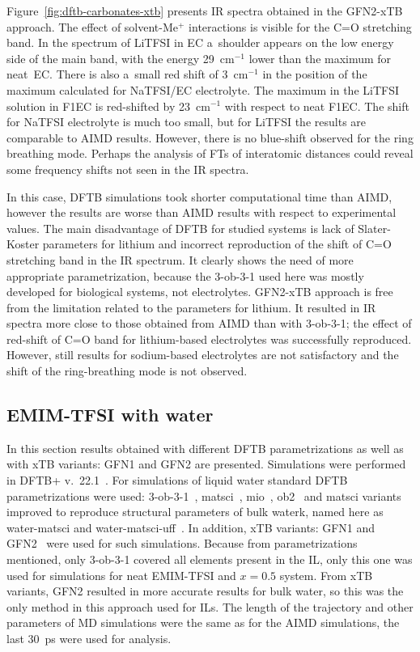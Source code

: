 Figure~\ref{fig:dftb-carbonates-xtb} presents IR spectra obtained in the GFN2-xTB approach. The effect of solvent-Me$^{+}$ interactions is visible for the C=O stretching band. In the spectrum of LiTFSI in EC a~shoulder appears on the low energy side of the main band, with the energy 29~cm$^{-1}$ lower than the maximum for neat~EC. There is also a~small red shift of 3~cm$^{-1}$ in the position of the maximum calculated for NaTFSI/EC electrolyte. The maximum in the LiTFSI solution in F1EC is red-shifted by 23~cm$^{-1}$ with respect to neat F1EC. The shift for NaTFSI electrolyte is much too small, but for LiTFSI the results are comparable to AIMD results. However, there is no blue-shift observed for the ring breathing mode. Perhaps the analysis of FTs of interatomic distances could reveal some frequency shifts not seen in the IR spectra.

In this case, DFTB simulations took shorter computational time than AIMD, however the results are worse than AIMD results with respect to experimental values. The main disadvantage of DFTB for studied systems is lack of Slater-Koster parameters for lithium and incorrect reproduction of the shift of C=O stretching band in the IR spectrum. It clearly shows the need of more appropriate parametrization, because the 3-ob-3-1 used here was mostly developed for biological systems, not electrolytes. GFN2-xTB approach is free from the limitation related to the parameters for lithium. It resulted in IR spectra more close to those obtained from AIMD than with 3-ob-3-1; the effect of red-shift of C=O band for lithium-based electrolytes was successfully reproduced. However, still results for sodium-based electrolytes are not satisfactory and the shift of the ring-breathing mode is not observed.

\cleardoublepage

\subsection{EMIM-TFSI with water}

In this section results obtained with different DFTB parametrizations as well as with xTB variants: GFN1 and GFN2 are presented. Simulations were performed in DFTB+ v.~22.1~\cite{dftb-plus}. For simulations of liquid water standard DFTB parametrizations were used: 3-ob-3-1~\cite{3ob-1,3ob-2,3ob-3,3ob-4}, matsci~\cite{matsci}, mio~\cite{mio}, ob2~\cite{ob2} and matsci variants improved to reproduce structural parameters of bulk waterk, named here as water-matsci and water-matsci-uff~\cite{water-matsci}. In addition, xTB variants: GFN1 and GFN2~\cite{xtb,gfn-2} were used for such simulations. Because from parametrizations mentioned, only 3-ob-3-1 covered all elements present in the IL, only this one was used for simulations for neat EMIM-TFSI and $x = 0.5$ system. From xTB variants, GFN2 resulted in more accurate results for bulk water, so this was the only method in this approach used for ILs. The length of the trajectory and other parameters of MD simulations were the same as for the AIMD simulations, the last 30~ps were used for analysis.

